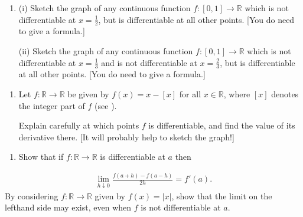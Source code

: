 \documentclass[letterpaper,10pt,english]{jupyterBook}
\begin{document}
\label{\detokenize{Problems:id43}}\begin{enumerate}
%
\setcounter{enumi}{42}
\item {} 
\sphinxAtStartPar
(i) Sketch the graph of any continuous function \(f:[0,1]\to \mathbb{R}\) which is not differentiable at \(x=\frac{1}{2}\), but is differentiable at all other points. {[}You do  need to give a formula.{]}

\sphinxAtStartPar
(ii) Sketch the graph of any continuous function \(f:[0,1]\to \mathbb{R}\) which is not differentiable at \(x=\frac{1}{3}\) and is not differentiable at \(x=\frac{2}{3}\), but is differentiable at all other points. {[}You do  need to give a formula.{]}

\end{enumerate}
\label{\detokenize{Problems:id44}}\begin{enumerate}
%
\setcounter{enumi}{43}
\item {} 
\sphinxAtStartPar
Let \(f:\mathbb{R}\to \mathbb{R}\) be given by \(f(x) = x - [x]\) for all \(x \in \mathbb{R}\), where \([x]\) denotes the integer part of \(f\) (see {\hyperref[\detokenize{Problems:equation-eq-x}]{}}).

Explain carefully at which points \(f\)  is differentiable, and find the value of its derivative there. {[}It will probably help to sketch the graph!{]}

\end{enumerate}
\label{\detokenize{Problems:id45}}\begin{enumerate}
%
\setcounter{enumi}{44}
\item {} 
\sphinxAtStartPar
Show that if \(f:\mathbb{R} \rightarrow \mathbb{R}\) is differentiable at \(a\) then

\end{enumerate}
\begin{equation*}
\begin{split}
\lim_{h \downarrow 0} \displaystyle\frac{f(a + h) - f(a - h)}{2h} = f'(a).
\end{split}
\end{equation*}
\sphinxAtStartPar
By considering \(f:\mathbb{R}\to\mathbb{R}\) given by \(f(x) = |x|\), show that the limit on the left\sphinxhyphen{}hand side may exist, even when \(f\) is not differentiable at \(a\).
\end{document}
